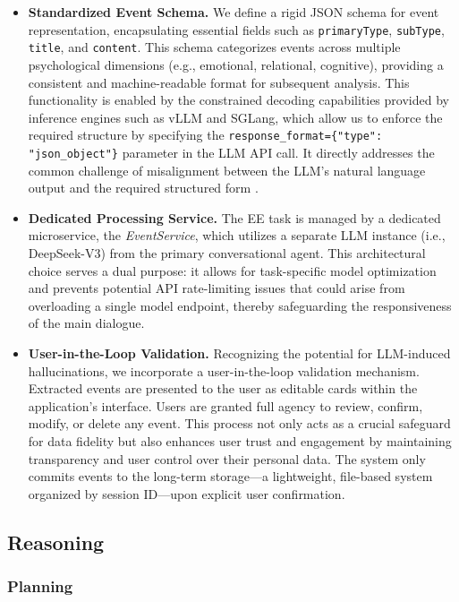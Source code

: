 \begin{itemize}
    \item \textbf{Standardized Event Schema.} We define a rigid JSON schema for event representation, encapsulating essential fields such as \texttt{primaryType}, \texttt{subType}, \texttt{title}, and \texttt{content}. This schema categorizes events across multiple psychological dimensions (e.g., emotional, relational, cognitive), providing a consistent and machine-readable format for subsequent analysis. This functionality is enabled by the constrained decoding capabilities provided by inference engines such as vLLM and SGLang, which allow us to enforce the required structure by specifying the \texttt{response\_format=\{"type": "json\_object"\}} parameter in the LLM API call. It directly addresses the common challenge of misalignment between the LLM's natural language output and the required structured form \cite{xu2023large}.

    \item \textbf{Dedicated Processing Service.} The EE task is managed by a dedicated microservice, the \textit{EventService}, which utilizes a separate LLM instance (i.e., DeepSeek-V3) from the primary conversational agent. This architectural choice serves a dual purpose: it allows for task-specific model optimization and prevents potential API rate-limiting issues that could arise from overloading a single model endpoint, thereby safeguarding the responsiveness of the main dialogue.

    \item \textbf{User-in-the-Loop Validation.} Recognizing the potential for LLM-induced hallucinations, we incorporate a user-in-the-loop validation mechanism. Extracted events are presented to the user as editable cards within the application's interface. Users are granted full agency to review, confirm, modify, or delete any event. This process not only acts as a crucial safeguard for data fidelity but also enhances user trust and engagement by maintaining transparency and user control over their personal data. The system only commits events to the long-term storage---a lightweight, file-based system organized by session ID---upon explicit user confirmation.
\end{itemize} 

\subsection{Reasoning}

\subsubsection{Planning}

